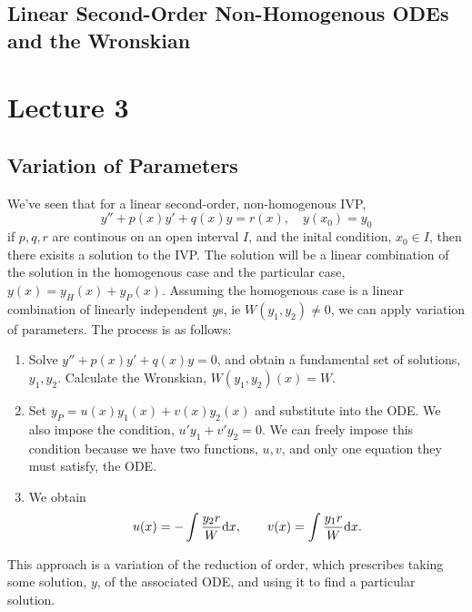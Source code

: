 \documentclass{report}
\begin{document}
\subsection{Linear Second-Order Non-Homogenous ODEs and the Wronskian}

\section{Lecture 3}
\subsection{Variation of Parameters}
We've seen that for a linear second-order, non-homogenous IVP,
$$
  y'' + p(x)y' + q(x)y = r(x),\quad y(x_0)=y_0
$$
if $p,q,r$ are continous on an open interval $I$, and the inital condition, $x_0\in I$, then there exisits a solution to the IVP. The solution will be a linear combination of the solution in the homogenous case and the particular case, $y(x) = y_H(x) + y_P(x)$. Assuming the homogenous case is a linear combination of linearly independent $y$s, ie $W(y_1, y_2) \neq 0$, we can apply variation of parameters. The process is as follows:
\begin{enumerate}
  \item Solve $y'' + p(x)y' + q(x)y = 0$, and obtain a fundamental set of solutions, $y_1, y_2$. Calculate the Wronskian, $W(y_1,y_2)(x) = W$.
  \item Set $y_P = u(x)y_1(x) + v(x)y_2(x)$ and substitute into the ODE. We also impose the condition, $u'y_1 + v'y_2 = 0$. We can freely impose this condition because we have two functions, $u,v$, and only one equation they must satisfy, the ODE.
  \item We obtain
  $$
    u(x) = -\int \frac{y_2r}{W}\mathrm{d} x,\qquad v(x) = \int \frac{y_1r}{W}\mathrm{d} x.
  $$
\end{enumerate}
This approach is a variation of the reduction of order, which prescribes taking some solution, $y$, of the associated ODE, and using it to find a particular solution.
\end{document}
